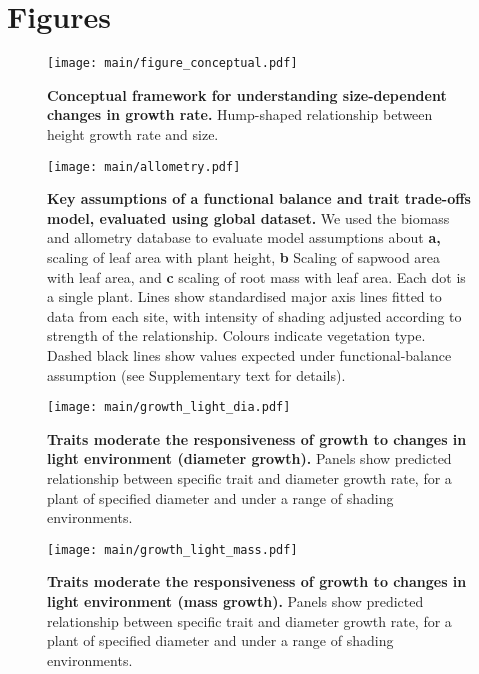 \documentclass[12pt, a4paper]{article}
\makeatletter
\def\maxwidth{\ifdim\Gin@nat@width>\linewidth\linewidth
\else\Gin@nat@width\fi}
\let\Oldincludegraphics\includegraphics
\renewcommand{\includegraphics}[1]{\Oldincludegraphics[width=\maxwidth]{#1}}
\makeatother
\begin{document}
\newpage

\section{Figures}\label{figures}


\newpage

\begin{figure}[ht]
\centering
\texttt{[image: main/figure\_conceptual.pdf]}
\caption{\textbf{Conceptual framework for understanding size-dependent
changes in growth rate.} Hump-shaped relationship between height growth rate and
size. \label{f-conceptual}}
\end{figure}

\newpage

\begin{figure}[ht]
\centering
\texttt{[image: main/allometry.pdf]}
\caption{\textbf{Key assumptions of a functional balance and trait
trade-offs model, evaluated using global dataset.} We used the biomass and
allometry database to evaluate model assumptions about \textbf{a,}
scaling of leaf area with plant height, \textbf{b} Scaling of sapwood
area with leaf area, and \textbf{c} scaling of root mass with leaf area.
Each dot is a single plant. Lines show standardised major axis lines
fitted to data from each site, with intensity of shading adjusted
according to strength of the relationship. Colours indicate vegetation
type. Dashed black lines show values expected under functional-balance
assumption (see Supplementary text for details). \label{f-assumptions}}
\end{figure}

\newpage

\begin{figure}[ht]
\centering
\texttt{[image: main/growth\_light\_dia.pdf]}
\caption{\textbf{Traits moderate the responsiveness of growth to changes
in light environment (diameter growth).} Panels show predicted relationship between
specific trait and diameter growth rate, for a plant of specified
diameter and under a range of shading environments.
\label{f-growth_light_dia}}
\end{figure}

\begin{figure}[ht]
\centering
\texttt{[image: main/growth\_light\_mass.pdf]}
\caption{\textbf{Traits moderate the responsiveness of growth to changes
in light environment (mass growth).} Panels show predicted relationship between
specific trait and diameter growth rate, for a plant of specified
diameter and under a range of shading environments.
\label{f-growth_light_mass}}
\end{figure}
\end{document}
